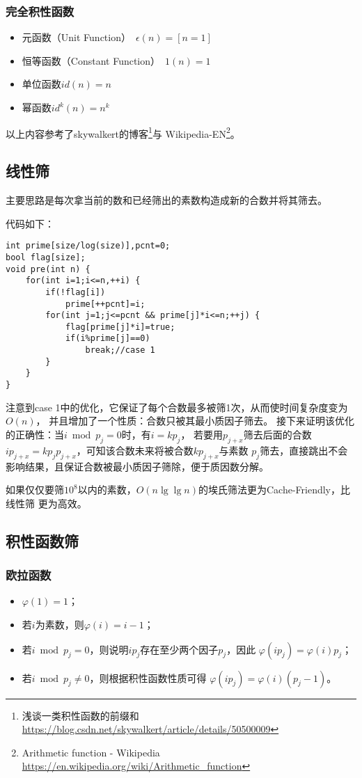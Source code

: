 \subsubsection{完全积性函数}
\begin{itemize}
	\item {}
	      元函数（Unit Function）~$\epsilon(n)=[n=1]$
	\item {}
	      恒等函数（Constant Function）~$1(n)=1$
	\item 单位函数$id(n)=n$
	\item 幂函数$id^k(n)=n^k$
\end{itemize}
以上内容参考了skywalkert的博客\footnote{浅谈一类积性函数的前缀和\\
	\url{https://blog.csdn.net/skywalkert/article/details/50500009}}与
Wikipedia-EN\footnote{Arithmetic function - Wikipedia
	\url{https://en.wikipedia.org/wiki/Arithmetic\_function}}。
\subsection{线性筛}
主要思路是每次拿当前的数和已经筛出的素数构造成新的合数并将其筛去。

代码如下：
\begin{lstlisting}[title=Euler]
int prime[size/log(size)],pcnt=0;
bool flag[size];
void pre(int n) {
    for(int i=1;i<=n,++i) {
        if(!flag[i])
            prime[++pcnt]=i;
        for(int j=1;j<=pcnt && prime[j]*i<=n;++j) {
            flag[prime[j]*i]=true;
            if(i%prime[j]==0)
                break;//case 1
        }
    }
}
\end{lstlisting}
注意到case 1中的优化，它保证了每个合数最多被筛1次，从而使时间复杂度变为$O(n)$，
并且增加了一个性质：合数只被其最小质因子筛去。
接下来证明该优化的正确性：当$i\bmod p_j=0$时，有$i=kp_j$，
若要用$p_{j+x}$筛去后面的合数$ip_{j+x}=kp_jp_{j+x}$，可知该合数未来将被合数$kp_{j+x}$与素数
$p_j$筛去，直接跳出不会影响结果，且保证合数被最小质因子筛除，便于质因数分解。

如果仅仅要筛$10^8$以内的素数，$O(n\lg\lg n)$的埃氏筛法更为Cache-Friendly，比线性筛
更为高效。
\subsection{积性函数筛}
\subsubsection{欧拉函数}
\begin{itemize}
	\item $\varphi(1)=1$；
	\item 若$i$为素数，则$\varphi(i)=i-1$；
	\item 若$i \bmod p_j=0$，则说明$ip_j$存在至少两个因子$p_j$，因此
	      $\varphi(ip_j)=\varphi(i)p_j$；
	\item 若$i \bmod p_j\neq 0$，则根据积性函数性质可得
	      $\varphi(ip_j)=\varphi(i)(p_j-1)$。
\end{itemize}
